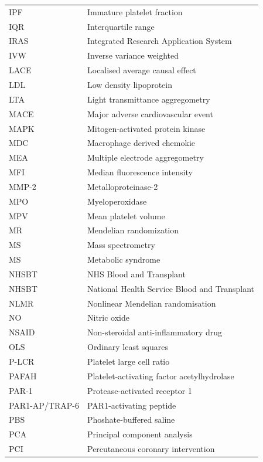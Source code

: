 \documentclass[11pt,twoside]{bristolthesis}
\begin{document}
\begin{abbreviations}
\begin{longtable}[t]{ll}
    IPF & Immature platelet fraction\\
    IQR & Interquartile range\\
    IRAS & Integrated Research Application System\\
    IVW & Inverse variance weighted\\
    \addlinespace
    LACE & Localised average causal effect\\
    LDL & Low density lipoprotein\\
    LTA & Light transmittance aggregometry\\
    MACE & Major adverse cardiovascular event\\
    MAPK & Mitogen-activated protein kinase\\
    \addlinespace
    MDC & Macrophage derived chemokie\\
    MEA & Multiple electrode aggregometry\\
    MFI & Median fluorescence intensity\\
    MMP-2 & Metalloproteinase-2\\
    MPO & Myeloperoxidase\\
    \addlinespace
    MPV & Mean platelet volume\\
    MR & Mendelian randomization\\
    MS & Mass spectrometry\\
    MS & Metabolic syndrome\\
    NHSBT & NHS Blood and Transplant\\
    \addlinespace
    NHSBT & National Health Service Blood and Transplant\\
    NLMR & Nonlinear Mendelian randomisation\\
    NO & Nitric oxide\\
    NSAID & Non-steroidal anti-inflammatory drug\\
    OLS & Ordinary least squares\\
    \addlinespace
    P-LCR & Platelet large cell ratio\\
    PAFAH & Platelet-activating factor acetylhydrolase\\
    PAR-1 & Protease-activated receptor 1\\
    PAR1-AP/TRAP-6 & PAR1-activating peptide\\
    PBS & Phoshate-buffered saline\\
    \addlinespace
    PCA & Principal component analysis\\
    PCI & Percutaneous coronary intervention\\

\end{longtable}
\end{abbreviations}
\end{document}
